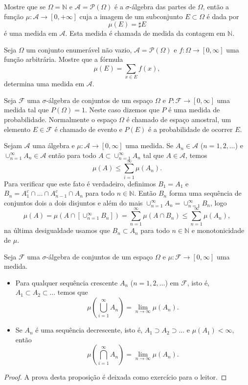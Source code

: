 \begin{exercicio}
 Mostre que se $\Omega=\mathbb{N}$ e $\mathcal{A}= \mathcal{P}(\Omega) $ é a $\sigma$-álgebra das partes de 
 $\Omega$, então a função $\mu:\mathcal{A}\to [0,+\infty]$ cuja a imagem de um subconjunto 
 $E\subset\Omega$ é dada por 
 \[
     \mu(E)=\sharp E
 \]
 é uma medida em $\mathcal{A}$. Esta medida é chamada de medida da contagem em $\mathbb{N}$.
\end{exercicio}

\begin{exercicio}
	Seja $\Omega$ um conjunto enumerável não vazio, $\mathcal{A}=\mathcal{P}(\Omega)$ e
	 $f:\Omega\to [0,\infty]$ 
	uma função arbitrária. Mostre que a fórmula 
	\[
	    \mu(E)=\sum_{x\in E} f(x),
	\]
	determina uma medida em $\mathcal{A}$.
\end{exercicio}


\begin{definicao}
Seja $\mathcal{F}$ uma $\sigma$-álgebra de conjuntos de um espaço $\Omega$ e 
$P:\mathcal{F}\to [0,\infty]$ uma medida tal que $P(\Omega)=1$.
Neste caso dizemos que $P$ é uma medida de probabilidade. 
Normalmente o espaço $\Omega$
é chamado de espaço amostral, um elemento $E\in\mathcal{F}$ é chamado
de evento e $P(E)$ é a probabilidade de ocorrer $E$.
\end{definicao}


Sejam $\mathcal{A}$ uma álgebra e $\mu:\mathcal{A}\to [0,\infty]$ uma medida.
Se $A_n\in\mathcal{A}$ ($n=1,2,\ldots$) e
$\cup_{n=1}^{\infty} A_n\in\mathcal{A}$ 
então para todo $A\subset \cup_{n=1}^{\infty} A_n$ tal que $A\in\mathcal{A}$, temos 
$$
\mu(A) \leq \sum_{i=1}^{\infty} \mu(A_n).
$$
Para verificar que este fato é verdadeiro, definimos $B_1=A_1$
e $B_n = A_1^c\cap \ldots \cap A_{n-1}^c\cap A_n$ para todo $n\in\mathbb{N}$.
Então $B_n$ forma uma sequência de conjuntos dois a dois disjuntos e além do
mais $\cup_{n=1}^{\infty} A_n=\cup_{n=1}^{\infty} B_n$, logo 
$$
\mu(A) 	= \mu(A\cap [\cup_{n=1}^{\infty} B_n])
		= \sum_{n=1}^{\infty} \mu(A\cap B_n)
		\leq \sum_{n=1}^{\infty} \mu(A_n),
$$
na última desigualdade usamos que $B_n\subset A_n$ para todo $n\in\mathbb{N}$
e monotonicidade de $\mu$. 


\begin{proposicao}
Seja $\mathcal{F}$ uma $\sigma$-álgebra de conjuntos de um espaço $\Omega$ e 
$\mu:\mathcal{F}\to [0,\infty]$ uma medida. 
\begin{itemize}
\item Para qualquer sequência crescente $A_n$
($n=1,2,\ldots$) em $\mathcal{F}$, isto é,  
$A_1\subset A_2\subset\ldots$ temos que 
$$
\mu\left( \bigcup_{i=1}^{\infty} A_n \right) = \lim_{n\to\infty} \mu(A_n).
$$ 
\item Se $A_n$ é uma sequência decrescente, isto é, 
$A_1\supset A_2\supset\ldots$ e $\mu(A_1)<\infty$, então 
$$
\mu\left( \bigcap_{i=1}^{\infty} A_n \right) = \lim_{n\to\infty} \mu(A_n).
$$ 
\end{itemize}
\end{proposicao}
\begin{proof}
A prova desta proposição é deixada como exercício para o leitor.
\end{proof}


